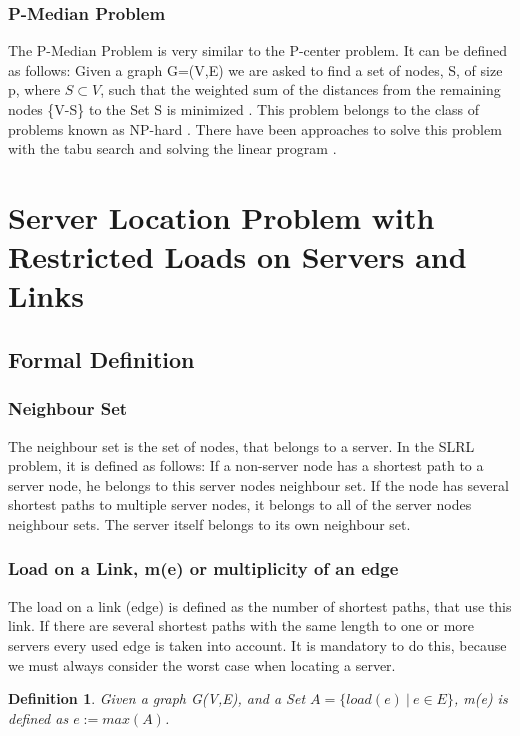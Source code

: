 \documentclass [12pt]{article}
\newtheorem{mydef}{Definition}
\begin{document}
\subsubsection {P-Median Problem}
The P-Median Problem is very similar to the P-center problem. It can be defined as follows:
Given a graph G=(V,E) we are asked to find a set of nodes, S, of size p, where $ S\subset V$, such that the weighted
sum of the distances from the remaining nodes \{V-S\} to the Set S is minimized \cite{Rolland1997329}.
This problem belongs to the class of problems known as NP-hard \cite{KarivHakimi1979median}. There have been
approaches to solve this problem with the tabu search \cite{Rolland1997329} and solving the linear program 
\cite{rosing1979p}.


\section{Server Location Problem with Restricted Loads on Servers and Links}
\subsection{Formal Definition}
\subsubsection{Neighbour Set}
The neighbour set is the set of nodes, that belongs to a server. In the SLRL problem, it is
defined as follows: If a non-server node has a shortest path to a server node, he 
belongs to this server nodes neighbour set. If the node has several shortest
paths to multiple server nodes, it belongs to all of the server nodes neighbour
sets. The server itself belongs to its own neighbour set.
\subsubsection{Load on a Link, m(e) or multiplicity of an edge}
The load on a link (edge) is defined as the number of shortest paths, that use this link. If there
are several shortest paths with the same length to one or more servers every
used edge is taken into account. It is mandatory to do this, because we must always consider
the worst case when locating a server. 
\begin{mydef}
  Given a graph G(V,E), and a Set $A= \{ load(e) \ | \ e \in E \}$, m(e) is defined as $e:= max(A)$.
\end{mydef}
\end{document}
